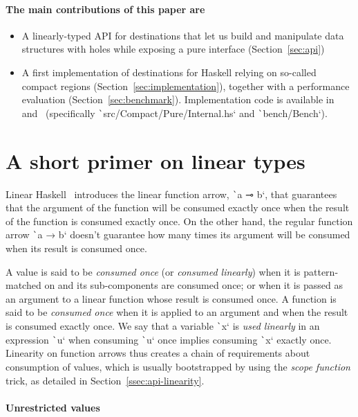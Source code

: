 \documentclass[english]{jflart}
\begin{document}
\paragraph{The main contributions of this paper are}
\begin{itemize}
\item A linearly-typed API for destinations that let us build and manipulate data structures with holes while exposing a pure interface (Section~\ref{sec:api})
\item A first implementation of destinations for Haskell relying on so-called compact regions (Section~\ref{sec:implementation}), together with a performance evaluation (Section~\ref{sec:benchmark}). Implementation code is available in~\cite{custom_ghc} and~\cite{linear_dest} (specifically \texttt`src/Compact/Pure/Internal.hs` and \texttt`bench/Bench`).
\end{itemize}

\section{A short primer on linear types}\label{sec:intro-linearity}

Linear Haskell~\cite{bernardy_linear_2018} introduces the linear function arrow, \texttt`a ⊸ b`, that guarantees that the argument of the function will be consumed exactly once when the result of the function is consumed exactly once. On the other hand, the regular function arrow \texttt`a → b` doesn't guarantee how many times its argument will be consumed when its result is consumed once.

A value is said to be \emph{consumed once} (or \emph{consumed linearly}) when it is pattern-matched on and its sub-components are consumed once; or when it is passed as an argument to a linear function whose result is consumed once. A function is said to be \emph{consumed once} when it is applied to an argument and when the result is consumed exactly once. We say that a variable \texttt`x` is \emph{used linearly} in an expression \texttt`u` when consuming \texttt`u` once implies consuming \texttt`x` exactly once. Linearity on function arrows thus creates a chain of requirements about consumption of values, which is usually bootstrapped by using the \emph{scope function} trick, as detailed in Section~\ref{ssec:api-linearity}.

\paragraph{Unrestricted values}
\end{document}
